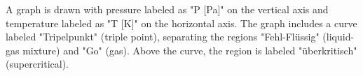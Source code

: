 A graph is drawn with pressure labeled as "P [Pa]" on the vertical axis and temperature labeled as "T [K]" on the horizontal axis. The graph includes a curve labeled "Tripelpunkt" (triple point), separating the regions "Fehl-Flüssig" (liquid-gas mixture) and "Go" (gas). Above the curve, the region is labeled "überkritisch" (supercritical).